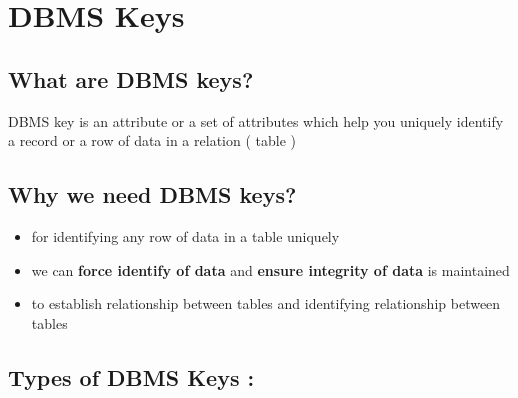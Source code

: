 \documentclass[10pt]{article}
\begin{document}
\section{DBMS Keys}

\subsection{What are DBMS keys?}

DBMS key is an attribute or a set of attributes which help you uniquely identify a record or a row of data in a relation ( table )

\subsection{Why we need DBMS keys?}

\begin{itemize}
	\item for identifying any row of data in a table uniquely
	\item we can \textbf{force identify of data} and \textbf{ensure integrity of data} is maintained
	\item to establish relationship between tables and identifying relationship between tables
\end{itemize}


\subsection{Types of DBMS Keys :}
\end{document}
